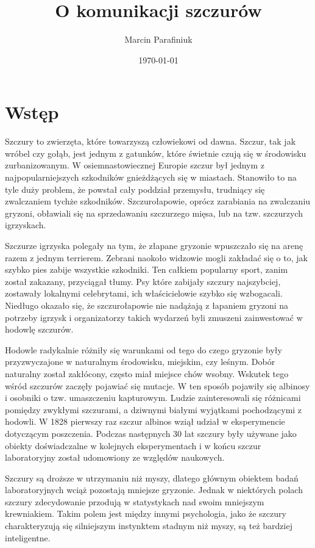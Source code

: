 \documentclass[12pt]{article}
\title{O komunikacji szczurów}
\author{Marcin Parafiniuk}
\date{\today}
\begin{document}
\maketitle

\tableofcontents

\pagebreak

\section{Wstęp}

Szczury to zwierzęta, które towarzyszą człowiekowi od dawna. Szczur, tak jak wróbel czy gołąb, jest jednym z gatunków, które świetnie czują się w środowisku zurbanizowanym. W osiemnastowiecznej Europie szczur był jednym z najpopularniejszych szkodników gnieżdżących się w miastach. Stanowiło to na tyle duży problem, że powstał cały poddział przemysłu, trudniący się zwalczaniem tychże szkodników. Szczurołapowie, oprócz zarabiania na zwalczaniu gryzoni, obławiali się na sprzedawaniu szczurzego mięsa, lub na tzw. szczurzych igrzyskach.

Szczurze igrzyska polegały na tym, że złapane gryzonie wpuszczało się na arenę razem z jednym terrierem. Zebrani naokoło widzowie mogli zakładać się o to, jak szybko pies zabije wszystkie szkodniki. Ten całkiem popularny sport, zanim został zakazany, przyciągał tłumy. Psy które zabijały szczury najszybciej, zostawały lokalnymi celebrytami, ich właścicielowie szybko się wzbogacali. Niedługo okazało się, że szczurołapowie nie nadążają z łapaniem gryzoni na potrzeby igrzysk i organizatorzy takich wydarzeń byli zmuszeni zainwestować w hodowlę szczurów.

Hodowle radykalnie różniły się warunkami od tego do czego gryzonie były przyzwyczajone w naturalnym środowisku, miejskim, czy leśnym. Dobór naturalny został zakłócony, często miał miejsce chów wsobny. Wskutek tego wśród szczurów zaczęły pojawiać się mutacje. W ten sposób pojawiły się albinosy i osobniki o tzw. umaszczeniu kapturowym. Ludzie zainteresowali się różnicami pomiędzy zwykłymi szczurami, a dziwnymi białymi wyjątkami pochodzącymi z hodowli. W 1828 pierwszy raz szczur albinos wziął udział w eksperymencie dotyczącym poszczenia. Podczas następnych 30 lat szczury były używane jako obiekty doświadczalne w kolejnych eksperymentach i w końcu szczur laboratoryjny został udomowiony ze względów naukowych.

Szczury są droższe w utrzymaniu niż myszy, dlatego głównym obiektem badań laboratoryjnych wciąż pozostają mniejsze gryzonie. Jednak w niektórych polach szczury zdecydowanie przodują w statystykach nad swoim mniejszym krewniakiem. Takim polem jest między innymi psychologia, jako że szczury charakteryzują się silniejszym instynktem stadnym niż myszy, są też bardziej inteligentne.
\end{document}
